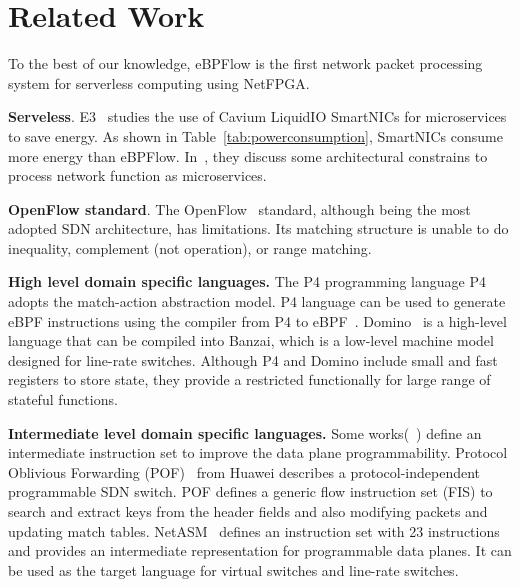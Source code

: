 \section{Related Work}
\label{sec:relatedWork}

%

 To the best of our knowledge, eBPFlow is the first network packet processing system for serverless computing using NetFPGA.


\textbf{Serveless}. E3~\cite{liu2019e3} studies the use of Cavium LiquidIO SmartNICs for microservices to save energy. As shown in Table~\ref{tab:powerconsumption}, SmartNICs consume more energy than eBPFlow. In~\cite{Singhvi:2017:GCN:3152434.3152450}, they discuss some architectural constrains to process network function as microservices.

\textbf{OpenFlow standard}. The OpenFlow~\cite{McKeown:2008:OpenFlow} standard, although being the most adopted SDN architecture, has limitations. Its matching structure is unable to do inequality, complement (not operation), or range matching. 


\textbf{High level domain specific languages.} The P4 programming language P4~\cite{Bosshart:2014:P4} adopts the match-action abstraction model. 
P4 language can be used to generate eBPF instructions using the compiler from P4 to eBPF~\cite{P42EBPF2015}. Domino~\cite{Sivaraman:2016:PTH:2934872.2934900} is a high-level language that can be compiled into Banzai, which is a low-level machine model designed for line-rate switches. 
Although P4 and Domino include small and fast registers to store state, they provide a restricted functionally for large range of stateful functions.

\textbf{Intermediate level domain specific languages.} Some works(~\cite{Song:2013:POF:2491185.2491190,Shahbaz:2015:NetASM,Sivaraman:2016:PTH:2934872.2934900}) define an intermediate instruction set to improve the data plane programmability.
Protocol Oblivious Forwarding (POF)~\cite{Song:2013:POF:2491185.2491190} from Huawei describes a protocol-independent programmable SDN switch. POF defines a generic flow instruction set (FIS) to search and extract keys from the header fields and also modifying packets and updating match tables. NetASM~\cite{Shahbaz:2015:NetASM} defines an instruction set with 23 instructions and provides an intermediate representation for programmable data planes. It can be used as the target language for virtual switches and line-rate switches. 

